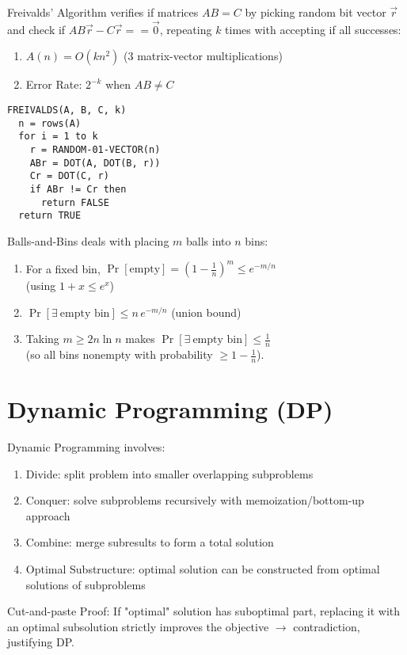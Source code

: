 \documentclass[12pt, a4paper]{article}
\begin{document}
\begin{multicols*}{3}
Freivalds' Algorithm verifies if matrices $AB = C$ by picking random bit vector $\vec{r}$ and check if $AB \vec{r} - C \vec{r} == \vec{0}$, repeating $k$ times with accepting if all successes:
\begin{enumerate}[\roman*.]
  \item $A(n) = O(kn^2)$ (3 matrix-vector multiplications)
  \item Error Rate: $2^{-k}$ when $AB \neq C$
\end{enumerate}
\begin{lstlisting}
FREIVALDS(A, B, C, k)    
  n = rows(A)               
  for i = 1 to k
    r = RANDOM-01-VECTOR(n) 
    ABr = DOT(A, DOT(B, r))
    Cr = DOT(C, r)
    if ABr != Cr then
      return FALSE   
  return TRUE
\end{lstlisting}

Balls-and-Bins deals with placing $m$ balls into $n$ bins:
\begin{enumerate}[\roman*.]
  \item For a fixed bin, $\Pr[\text{empty}]=(1-\tfrac1n)^m \le e^{-m/n}$\\(using $1+x\le e^x$)
  \item $\Pr[\exists\ \text{empty bin}] \le n\,e^{-m/n}$ (union bound) 
  \item Taking $m \ge 2n\ln n$ makes $\Pr[\exists\ \text{empty bin}] \leq \frac{1}{n}$\\(so all bins nonempty with probability $\ge 1-\tfrac1n$).
\end{enumerate}
\vspace{-1em}
\colbreak
\section{Dynamic Programming (DP)} %

Dynamic Programming involves:
\begin{enumerate}[\roman*.]
  \item Divide: split problem into smaller overlapping subproblems
  \item Conquer: solve subproblems recursively with memoization/bottom-up approach
  \item Combine: merge subresults to form a total solution
  \item Optimal Substructure: optimal solution can be constructed from optimal solutions of subproblems
\end{enumerate}

Cut-and-paste Proof: If "optimal" solution has suboptimal part, replacing it with an optimal subsolution strictly improves the objective $\rightarrow$ contradiction, justifying DP. 


\end{multicols*}
\end{document}
